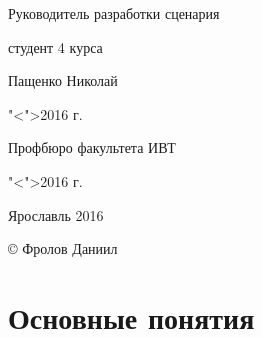 \documentclass[a4paper, 14pt]{extarticle}
\theoremstyle{definition}
\begin{document}
{\medskip

\begin{flushright}
	Руководитель разработки сценария\par
	студент 4 курса\par
	\underline{\hspace{3.5cm}}Пащенко Николай\par
	"<\underline{\hspace{0.8cm}}">\underline{\hspace{3.5cm}}2016 г.\par
\end{flushright}

\bigskip 
\bigskip

\begin{flushright}
	Профбюро факультета ИВТ\par
	"<\underline{\hspace{0.8cm}}">\underline{\hspace{3.5cm}}2016 г.\par
\end{flushright}

\vspace{\fill}

\begin{center}
	Ярославль 2016
\end{center}

\begin{flushright}
	\copyright \hspace{0.1cm} Фролов Даниил
\end{flushright}

\clearpage
}


\tableofcontents


\cleardoublepage
{}
{}
\section*{Основные понятия}
\end{document}
